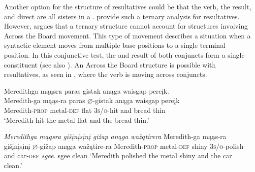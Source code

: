 \documentclass[output=paper]{LSP/langsci}
\begin{document}
Another option for the structure of resultatives could be that the verb, the result, and direct  are all sisters in a .  \citet{Carrier1992} provide such a ternary analysis for  resultatives. However, \citet{Bowers1997} argues that a ternary structure cannot account for structures involving Across the Board movement. This type of movement describes a situation when a syntactic element moves from multiple base positions to a single terminal position. In this conjunctive test, the  and result of both conjuncts form a single constituent (see also \citealt{Li1999}). An Across the Board structure is possible with  resultatives, as seen in , where the verb is moving across conjuncts.

\begin{exe}
\ex\label{ex:rosen:26}
\begin{xlist}

\ex \glll Meredithga mąąsra paras gistak anąga waisgap pereįk. \\
Meredith-ga mąąs-ra paras {$\varnothing$}-gistak anąga waisgap pereįk\\
Meredith-\textsc{prop} metal-\textsc{def} flat \textsc{3s/o}-hit and bread thin\\
\glt `Meredith hit the metal flat and the bread thin.'

\ex \textit{Meredithga \hspace{1.58em} mąąsra \hspace{.9em} gišįnį{s}įnį \hspace{.1em}gižap  \hspace {2.4em} anąga wažątirera}  \newline Meredith-ga \hspace{1.18em} mąąs-ra \hspace {.5em} gišįnį{s}įnį {$\varnothing$}-gižap \hspace{1.3em} anąga wažątire-ra \newline Meredith-\textsc{prop} metal-\textsc{def} shiny \hspace{1.6em} \textsc{3s/o}-polish and \hspace{1em} car-\textsc{def} \newline\textit{sgee}. \newline
sgee \newline
clean \newline
`Meredith polished the metal shiny and the car clean.'

\end{xlist}
\end{exe}
 
\end{document}
